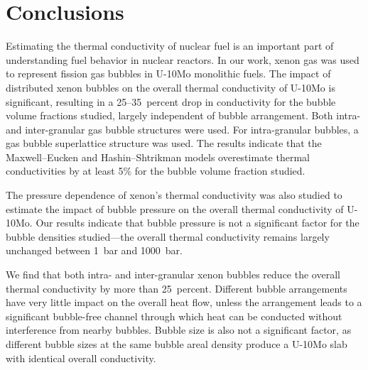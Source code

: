\section{\label{sec:conclusion}Conclusions}
Estimating the thermal conductivity of nuclear fuel is an important part of understanding fuel behavior in nuclear reactors. In our work, xenon gas was used to represent fission gas bubbles in U-10Mo monolithic fuels. The impact of distributed xenon bubbles on the overall thermal conductivity of U-10Mo is significant, resulting in a 25--35~percent drop in conductivity for the bubble volume fractions studied, largely independent of bubble arrangement. Both intra- and inter-granular gas bubble structures were used. For intra-granular bubbles, a gas bubble superlattice structure was used. The results indicate that the Maxwell--Eucken and Hashin--Shtrikman models overestimate thermal conductivities by at least 5\% for the bubble volume fraction studied.

The pressure dependence of xenon's thermal conductivity was also studied to estimate the impact of bubble pressure on the overall thermal conductivity of U-10Mo. Our results indicate that bubble pressure is not a significant factor for the bubble densities studied---the overall thermal conductivity remains largely unchanged between 1~bar and 1000~bar.

We find that both intra- and inter-granular xenon bubbles reduce the overall thermal conductivity by more than 25~percent. Different bubble arrangements have very little impact on the overall heat flow, unless the arrangement leads to a significant bubble-free channel through which heat can be conducted without interference from nearby bubbles. Bubble size is also not a significant factor, as different bubble sizes at the same bubble areal density produce a U-10Mo slab with identical overall conductivity.




